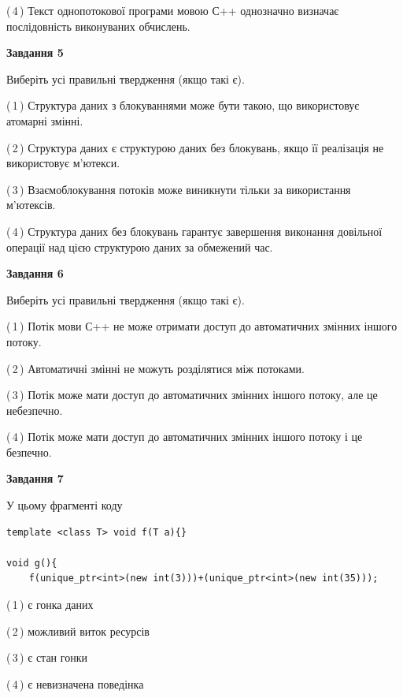 \documentclass[12pt, ukrainian]{article}
\begin{document}
\begin {large}
{(\,4\,) Текст однопотокової програми мовою С++ однозначно визначає послідовність виконуваних обчислень.%


\begin{center}
\textbf{Завдання 5}
\end{center}

Виберіть усі правильні твердження (якщо такі є).\par
\vspace{2mm}

(\,1\,) Структура даних з блокуваннями може бути такою, що використовує атомарні змінні.%

(\,2\,) Структура даних є структурою даних без блокувань, якщо її реалізація не використовує м’ютекси.%

(\,3\,) Взаємоблокування потоків може виникнути тільки за використання м’ютексів.%

(\,4\,) Структура даних без блокувань гарантує завершення виконання довільної операції над цією структурою даних за обмежений час.%
\newpage


\begin{center}
\textbf{Завдання 6}
\end{center}

Виберіть усі правильні твердження (якщо такі є).\par
\vspace{2mm}

(\,1\,) Потік мови С++ не може отримати доступ до автоматичних змінних іншого потоку.%

(\,2\,) Автоматичні змінні не можуть розділятися між потоками.%

(\,3\,) Потік може мати доступ до автоматичних змінних іншого потоку, але це небезпечно.%

(\,4\,) Потік може мати доступ до автоматичних змінних іншого потоку і це безпечно.%


\begin{center}
\textbf{Завдання 7}
\end{center}

У цьому фрагменті коду
\begin{verbatim}
template <class T> void f(T a){}

void g(){
    f(unique_ptr<int>(new int(3)))+(unique_ptr<int>(new int(35)));
\end{verbatim}

(\,1\,) є гонка даних%

(\,2\,) можливий виток ресурсів%

(\,3\,) є стан гонки%

(\,4\,) є невизначена поведінка%

}
\end {large}

\vspace{4mm}
\newpage
\end{document}
